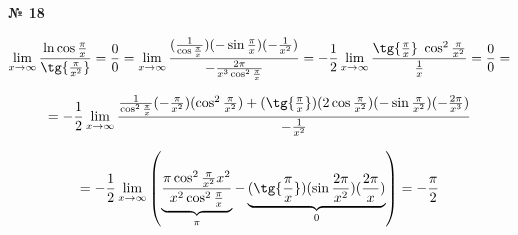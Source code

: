 \documentclass{article}
\begin{document}
\textbf{№ 18} 
\large

$$ \lim\limits_{x \to \infty} \frac{\ln{\cos{\frac{\pi}{x}}}}{\tg{\frac{\pi}{x^2}}} 
= \frac{0}{0}
= \lim\limits_{x \to \infty} \frac{ (\frac{1}{\cos{\frac{\pi}{x}}}) (-\sin{\frac{\pi}{x}}) (-\frac{1}{x^2}) }{-\frac{2\pi}{x^3\cos^2{\frac{\pi}{x}}}} 
= -\frac{1}{2} \lim\limits_{x \to \infty} \frac{\tg{\frac{\pi}{x}} \ \cos^2{\frac{\pi}{x^2}}}{\frac{1}{x}}
= \frac{0}{0}
= $$  

$$ = -\frac{1}{2} \lim\limits_{x \to \infty} \frac{ \frac{1}{\cos^2{\frac{\pi}{x}}} (-\frac{\pi}{x^2}) (\cos^2{\frac{\pi}{x^2}}) + (\tg{\frac{\pi}{x}}) (2\cos{\frac{\pi}{x^2}}) (-\sin{\frac{\pi}{x^2}}) (-\frac{2\pi}{x^3}) }{-\frac{1}{x^2}} $$

$$ = -\frac{1}{2} \lim\limits_{x \to \infty} \left( \underbrace{\frac{\pi \cos^2{\frac{\pi}{x^2}} x^2}{x^2 \cos^2{\frac{\pi}{x}}}}_{\pi} - \underbrace{(\tg{\frac{\pi}{x}}) (\sin{\frac{2\pi}{x^2}}) (\frac{2\pi}{x})}_{0} \right) 
= -\frac{\pi}{2}$$
\end{document}
